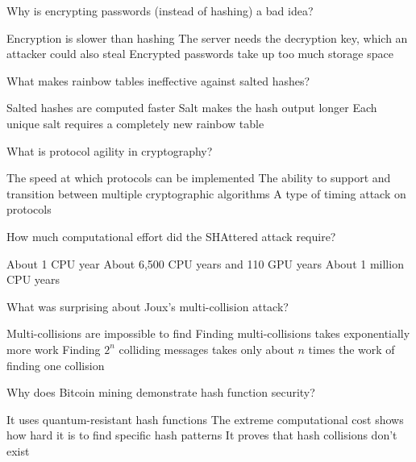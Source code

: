 \documentclass[10pt,a4paper,american]{exam}
\begin{document}
\begin{questions}
	\question Why is encrypting passwords (instead of hashing) a bad idea?
	\begin{randomizechoices}
		\choice Encryption is slower than hashing
		\CorrectChoice The server needs the decryption key, which an attacker could also steal
		\choice Encrypted passwords take up too much storage space
	\end{randomizechoices}

	\question What makes rainbow tables ineffective against salted hashes?
	\begin{randomizechoices}
		\choice Salted hashes are computed faster
		\choice Salt makes the hash output longer
		\CorrectChoice Each unique salt requires a completely new rainbow table
	\end{randomizechoices}

	\question What is protocol agility in cryptography?
	\begin{randomizechoices}
		\choice The speed at which protocols can be implemented
		\CorrectChoice The ability to support and transition between multiple cryptographic algorithms
		\choice A type of timing attack on protocols
	\end{randomizechoices}

	\question How much computational effort did the SHAttered attack require?
	\begin{randomizechoices}
		\choice About 1 CPU year
		\CorrectChoice About 6,500 CPU years and 110 GPU years
		\choice About 1 million CPU years
	\end{randomizechoices}

	\question What was surprising about Joux's multi-collision attack?
	\begin{randomizechoices}
		\choice Multi-collisions are impossible to find
		\choice Finding multi-collisions takes exponentially more work
		\CorrectChoice Finding $2^n$ colliding messages takes only about $n$ times the work of finding one collision
	\end{randomizechoices}

	\question Why does Bitcoin mining demonstrate hash function security?
	\begin{randomizechoices}
		\choice It uses quantum-resistant hash functions
		\CorrectChoice The extreme computational cost shows how hard it is to find specific hash patterns
		\choice It proves that hash collisions don't exist
	\end{randomizechoices}

\end{questions}

\clearpage

\end{document}
